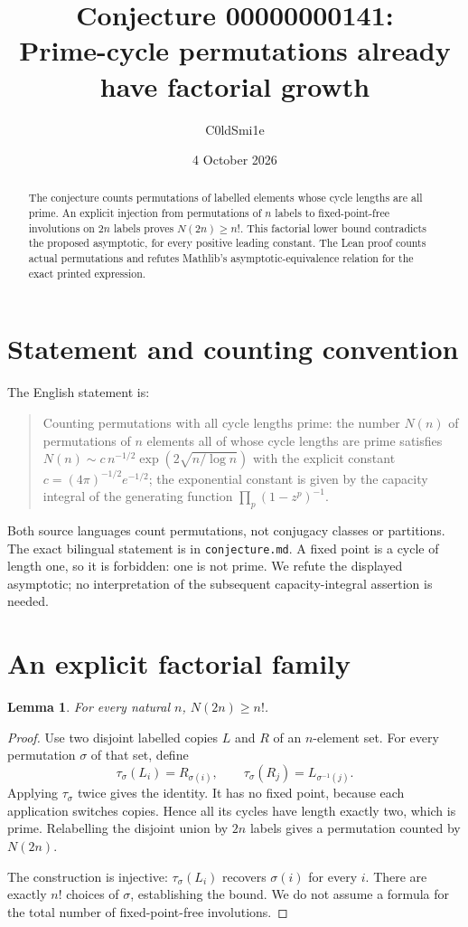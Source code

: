 \documentclass[11pt]{article}
\title{Conjecture 00000000141:\\Prime-cycle permutations already have factorial growth}
\author{C0ldSmi1e}
\date{4 October 2026}
\newtheorem{lemma}[theorem]{Lemma}
\begin{document}
\maketitle
\begin{abstract}
The conjecture counts permutations of labelled elements whose cycle lengths are all prime. An explicit injection from permutations of $n$ labels to fixed-point-free involutions on $2n$ labels proves $N(2n)\geq n!$. This factorial lower bound contradicts the proposed asymptotic, for every positive leading constant. The Lean proof counts actual permutations and refutes Mathlib's asymptotic-equivalence relation for the exact printed expression.
\end{abstract}

\section{Statement and counting convention}
The English statement is:
\begin{quote}
Counting permutations with all cycle lengths prime: the number $N(n)$ of permutations of $n$ elements all of whose cycle lengths are prime satisfies
$N(n)\sim c\,n^{-1/2}\exp(2\sqrt{n/\log n})$
with the explicit constant $c=(4\pi)^{-1/2}e^{-1/2}$; the exponential constant is given by the capacity integral of the generating function $\prod_p(1-z^p)^{-1}$.
\end{quote}
Both source languages count permutations, not conjugacy classes or partitions. The exact bilingual statement is in \texttt{conjecture.md}. A fixed point is a cycle of length one, so it is forbidden: one is not prime. We refute the displayed asymptotic; no interpretation of the subsequent capacity-integral assertion is needed.

\section{An explicit factorial family}
\begin{lemma}\label{count}
For every natural $n$, $N(2n)\geq n!$.
\end{lemma}
\begin{proof}
Use two disjoint labelled copies $L$ and $R$ of an $n$-element set. For every permutation $\sigma$ of that set, define
\[
 \tau_\sigma(L_i)=R_{\sigma(i)},\qquad
 \tau_\sigma(R_j)=L_{\sigma^{-1}(j)}.
\]
Applying $\tau_\sigma$ twice gives the identity. It has no fixed point, because each application switches copies. Hence all its cycles have length exactly two, which is prime. Relabelling the disjoint union by $2n$ labels gives a permutation counted by $N(2n)$.

The construction is injective: $\tau_\sigma(L_i)$ recovers $\sigma(i)$ for every $i$. There are exactly $n!$ choices of $\sigma$, establishing the bound. We do not assume a formula for the total number of fixed-point-free involutions.
\end{proof}
\end{document}
